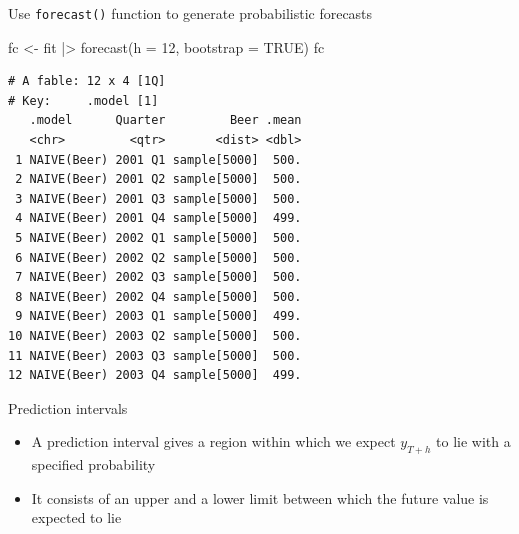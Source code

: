 \documentclass[
  14pt,
  ignorenonframetext,
  aspectratio=169,
]{beamer}
\newenvironment{Shaded}{\begin{snugshade}}{\end{snugshade}}
\newcommand{\AttributeTok}[1]{\textcolor[rgb]{0.77,0.63,0.00}{#1}}
\newcommand{\ConstantTok}[1]{\textcolor[rgb]{0.00,0.00,0.00}{#1}}
\newcommand{\DecValTok}[1]{\textcolor[rgb]{0.00,0.00,0.81}{#1}}
\newcommand{\FunctionTok}[1]{\textcolor[rgb]{0.00,0.00,0.00}{#1}}
\newcommand{\NormalTok}[1]{\textcolor[rgb]{0.00,0.00,0.00}{#1}}
\newcommand{\OtherTok}[1]{\textcolor[rgb]{0.56,0.35,0.01}{#1}}
\newcommand{\SpecialCharTok}[1]{\textcolor[rgb]{0.00,0.00,0.00}{#1}}
\providecommand{\tightlist}{%
  \setlength{\itemsep}{0pt}\setlength{\parskip}{0pt}}\usepackage{longtable,booktabs,array}
\renewenvironment{Shaded}{\vspace*{0.15cm}\color{black}\fontsize{10}{10}\sf\begin{snugshade}\color{black}}{\end{snugshade}}
\begin{document}
\begin{frame}[fragile]{Use \texttt{forecast()} function to generate
probabilistic forecasts}
\protect\hypertarget{use-forecast-function-to-generate-probabilistic-forecasts}{}
\fontsize{10}{13}\sf

\begin{Shaded}
\begin{Highlighting}[]
\NormalTok{fc }\OtherTok{\textless{}{-}}\NormalTok{ fit }\SpecialCharTok{|\textgreater{}} \FunctionTok{forecast}\NormalTok{(}\AttributeTok{h =} \DecValTok{12}\NormalTok{, }\AttributeTok{bootstrap =} \ConstantTok{TRUE}\NormalTok{)}
\NormalTok{fc}
\end{Highlighting}
\end{Shaded}

\begin{verbatim}
# A fable: 12 x 4 [1Q]
# Key:     .model [1]
   .model      Quarter         Beer .mean
   <chr>         <qtr>       <dist> <dbl>
 1 NAIVE(Beer) 2001 Q1 sample[5000]  500.
 2 NAIVE(Beer) 2001 Q2 sample[5000]  500.
 3 NAIVE(Beer) 2001 Q3 sample[5000]  500.
 4 NAIVE(Beer) 2001 Q4 sample[5000]  499.
 5 NAIVE(Beer) 2002 Q1 sample[5000]  500.
 6 NAIVE(Beer) 2002 Q2 sample[5000]  500.
 7 NAIVE(Beer) 2002 Q3 sample[5000]  500.
 8 NAIVE(Beer) 2002 Q4 sample[5000]  500.
 9 NAIVE(Beer) 2003 Q1 sample[5000]  499.
10 NAIVE(Beer) 2003 Q2 sample[5000]  500.
11 NAIVE(Beer) 2003 Q3 sample[5000]  500.
12 NAIVE(Beer) 2003 Q4 sample[5000]  499.
\end{verbatim}
\end{frame}

\begin{frame}{Prediction intervals}
\protect\hypertarget{prediction-intervals}{}
\begin{itemize}
\tightlist
\item
  A prediction interval gives a region within which we expect
  \(y_{T+h}\) to lie with a specified probability
\item
  It consists of an upper and a lower limit between which the future
  value is expected to lie
\end{itemize}
\end{frame}
\end{document}
